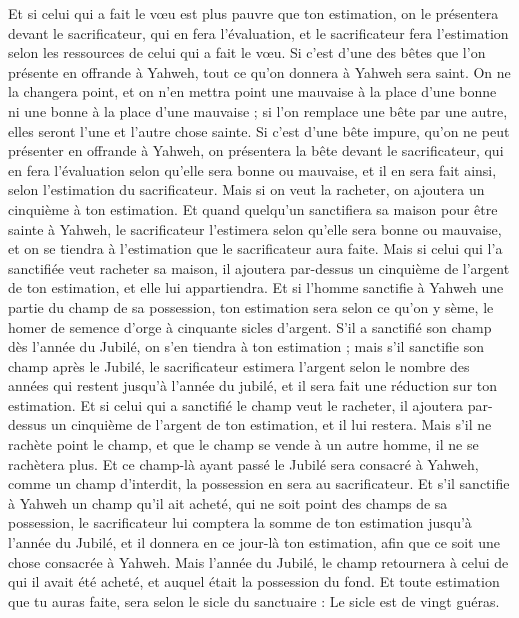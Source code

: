 \begin{multicols}{2}
Et si celui qui a fait le vœu est plus pauvre que ton estimation, on le présentera devant le sacrificateur, qui en fera l'évaluation, et le sacrificateur fera l'estimation selon les ressources de celui qui a fait le vœu.
Si c'est d'une des bêtes que l'on présente en offrande à Yahweh, tout ce qu'on donnera à Yahweh sera saint.
On ne la changera point, et on n'en mettra point une mauvaise à la place d'une bonne ni une bonne à la place d'une mauvaise ; si l'on remplace une bête par une autre, elles seront l'une et l'autre chose sainte.
Si c'est d'une bête impure, qu'on ne peut présenter en offrande à Yahweh, on présentera la bête devant le sacrificateur,
qui en fera l'évaluation selon qu'elle sera bonne ou mauvaise, et il en sera fait ainsi, selon l'estimation du sacrificateur.
Mais si on veut la racheter, on ajoutera un cinquième à ton estimation.
Et quand quelqu'un sanctifiera sa maison pour être sainte à Yahweh, le sacrificateur l'estimera selon qu'elle sera bonne ou mauvaise, et on se tiendra à l'estimation que le sacrificateur aura faite.
Mais si celui qui l'a sanctifiée veut racheter sa maison, il ajoutera par-dessus un cinquième de l'argent de ton estimation, et elle lui appartiendra.
Et si l'homme sanctifie à Yahweh une partie du champ de sa possession, ton estimation sera selon ce qu'on y sème, le homer de semence d'orge à cinquante sicles d'argent.
S'il a sanctifié son champ dès l'année du Jubilé, on s'en tiendra à ton estimation ;
mais s'il sanctifie son champ après le Jubilé, le sacrificateur estimera l'argent selon le nombre des années qui restent jusqu'à l'année du jubilé, et il sera fait une réduction sur ton estimation.
Et si celui qui a sanctifié le champ veut le racheter, il ajoutera par-dessus un cinquième de l'argent de ton estimation, et il lui restera.
Mais s'il ne rachète point le champ, et que le champ se vende à un autre homme, il ne se rachètera plus.
Et ce champ-là ayant passé le Jubilé sera consacré à Yahweh, comme un champ d'interdit, la possession en sera au sacrificateur.
Et s'il sanctifie à Yahweh un champ qu'il ait acheté, qui ne soit point des champs de sa possession,
le sacrificateur lui comptera la somme de ton estimation jusqu'à l'année du Jubilé, et il donnera en ce jour-là ton estimation, afin que ce soit une chose consacrée à Yahweh.
Mais l'année du Jubilé, le champ retournera à celui de qui il avait été acheté, et auquel était la possession du fond.
Et toute estimation que tu auras faite, sera selon le sicle du sanctuaire : Le sicle est de vingt guéras.

\end{multicols}
